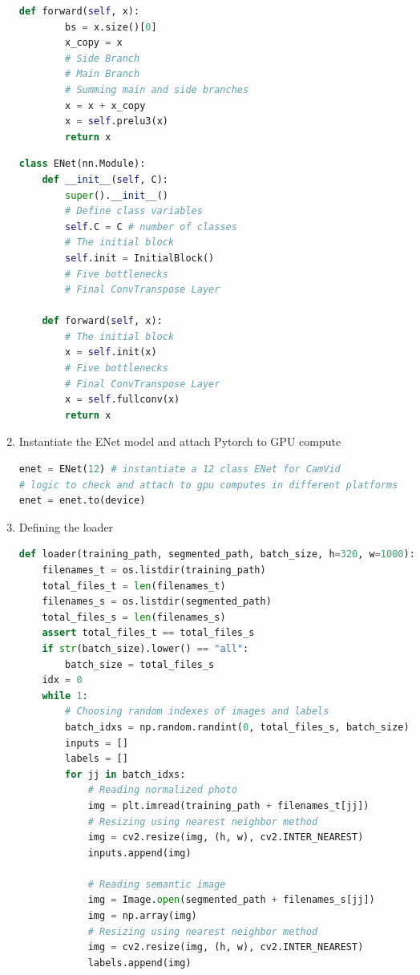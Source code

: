 \begin{enumerate}
\begin{lstlisting}[language=Python]
    def forward(self, x):
        bs = x.size()[0]
        x_copy = x
        # Side Branch
        # Main Branch
        # Summing main and side branches
        x = x + x_copy
        x = self.prelu3(x)
        return x
        \end{lstlisting}

          \begin{lstlisting}[language=Python]
class ENet(nn.Module):
    def __init__(self, C):
        super().__init__()
        # Define class variables
        self.C = C # number of classes
        # The initial block
        self.init = InitialBlock()
        # Five bottlenecks
        # Final ConvTranspose Layer

    def forward(self, x):
        # The initial block
        x = self.init(x)
        # Five bottlenecks
        # Final ConvTranspose Layer
        x = self.fullconv(x)
        return x
        \end{lstlisting}
    \item Instantiate the ENet model and attach Pytorch to GPU compute \textit{}
          \begin{lstlisting}[language=Python]
enet = ENet(12) # instantiate a 12 class ENet for CamVid
# logic to check and attach to gpu computes in different platforms
enet = enet.to(device)
        \end{lstlisting}
    \item Defining the loader
          \begin{lstlisting}[language=Python]
def loader(training_path, segmented_path, batch_size, h=320, w=1000):
    filenames_t = os.listdir(training_path)
    total_files_t = len(filenames_t)
    filenames_s = os.listdir(segmented_path)
    total_files_s = len(filenames_s)
    assert total_files_t == total_files_s
    if str(batch_size).lower() == "all":
        batch_size = total_files_s
    idx = 0
    while 1:
        # Choosing random indexes of images and labels
        batch_idxs = np.random.randint(0, total_files_s, batch_size)
        inputs = []
        labels = []
        for jj in batch_idxs:
            # Reading normalized photo
            img = plt.imread(training_path + filenames_t[jj])
            # Resizing using nearest neighbor method
            img = cv2.resize(img, (h, w), cv2.INTER_NEAREST)
            inputs.append(img)

            # Reading semantic image
            img = Image.open(segmented_path + filenames_s[jj])
            img = np.array(img)
            # Resizing using nearest neighbor method
            img = cv2.resize(img, (h, w), cv2.INTER_NEAREST)
            labels.append(img)


\end{lstlisting}
\end{enumerate}
